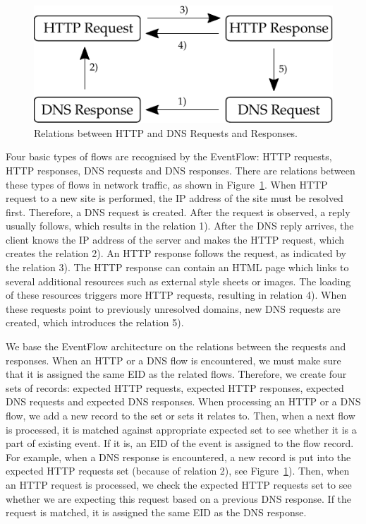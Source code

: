 \begin{figure}[!tb]
    \centering 
    \includegraphics{figures/paper-eventflow/dependencies}
    \caption{Relations between HTTP and DNS Requests and Responses.}
    \label{fig:eventflow-relations}
\end{figure}

Four basic types of flows are recognised by the EventFlow: HTTP requests, HTTP responses, DNS requests and DNS responses. There are relations between these types of flows in network traffic, as shown in Figure~\ref{fig:eventflow-relations}. When HTTP request to a new site is performed, the IP address of the site must be resolved first. Therefore, a DNS request is created. After the request is observed, a reply usually follows, which results in the relation 1). After the DNS reply arrives, the client knows the IP address of the server and makes the HTTP request, which creates the relation 2). An HTTP response follows the request, as indicated by the relation 3). The HTTP response can contain an HTML page which links to several additional resources such as external style sheets or images. The loading of these resources triggers more HTTP requests, resulting in relation 4). When these requests point to previously unresolved domains, new DNS requests are created, which introduces the relation 5).

We base the EventFlow architecture on the relations between the requests and responses. When an HTTP or a DNS flow is encountered, we must make sure that it is assigned the same EID as the related flows. Therefore, we create four sets of records: expected HTTP requests, expected HTTP responses, expected DNS requests and expected DNS responses. When processing an HTTP or a DNS flow, we add a new record to the set or sets it relates to. Then, when a next flow is processed, it is matched against appropriate expected set to see whether it is a part of existing event. If it is, an EID of the event is assigned to the flow record. For example, when a DNS response is encountered, a new record is put into the expected HTTP requests set (because of relation 2), see Figure~\ref{fig:eventflow-relations}). Then, when an HTTP request is processed, we check the expected HTTP requests set to see whether we are expecting this request based on a previous DNS response. If the request is matched, it is assigned the same EID as the DNS response. 

